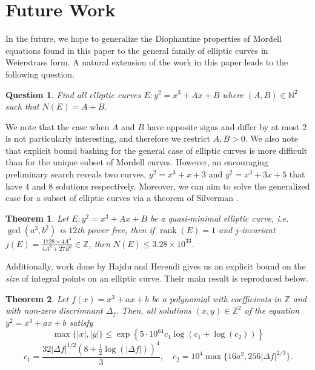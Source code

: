 \documentclass[12pt]{amsart}
\theoremstyle{plain}
\newtheorem{thm}{Theorem}
\newtheorem*{unnumberedqn}{Question}
\theoremstyle{definition}
\theoremstyle{remark}
\numberwithin{equation}{section}
\numberwithin{thm}{section}
\theoremstyle{named}
\theoremstyle{named}
\begin{document}
\section{Future Work}
In the future, we hope to generalize the Diophantine properties of Mordell equations found in this paper to the general family of elliptic curves in Weierstrass form. A natural extension of the work in this paper leads to the following question.
\begin{unnumberedqn}
    Find all elliptic curves $E : y^2 = x^3 + Ax + B$ where $(A,B) \in \mathbb{N}^2$ such that $N(E) = A + B.$
\end{unnumberedqn}
We note that the case when $A$ and $B$ have opposite signs and differ by at most $2$ is not particularly interesting, and therefore we restrict $A, B > 0$. We also note that {explicit} bound bashing for the general case of elliptic curves is more difficult than for the unique subset of Mordell curves. However, an encouraging preliminary search reveals two curves, $y^2 = x^3 + x + 3$ and $y^2 = x^3 + 3x + 5$ that have $4$ and $8$ solutions respectively. Moreover, we can aim to solve the generalized case for a subset of elliptic curves via a theorem of {Silverman} \cite{Silverman+1987+60+100}.
\begin{thm}
Let $E: y^2 = x^3 + Ax + B$ be a quasi-minimal elliptic curve, i.e. $\gcd(a^3, b^2)$ is $12$th power free, then if $\operatorname{rank}(E) = 1$ and $j$-invariant $j(E)=\frac{1728 \times 4A^3}{4A^3 + 27B^2} \in \mathbb{Z}$, then $N(E) \leq 3.28 \times 10^{33}.$ 
\end{thm}
Additionally, work done by {Hajdu and Herendi} \cite{HAJDU1998361} gives us an explicit bound on the \emph{size} of integral points on an elliptic curve. Their main result is reproduced below. 
\begin{thm}
    Let $f(x) = x^3 + ax + b$ be a polynomial with coefficients in $\mathbb{Z}$ and with non-zero discrimnant $\Delta_f.$ Then, all solutions $(x,y) \in \mathbb{Z}^2$ of the equation $y^2 = x^3 + ax + b$ satisfy\[
\max\{|x|, |y|\} \leq \exp\left\{5 \cdot 10^{64} c_1 \log(c_1 + \log(c_2))\right\}
\]
\[
c_1 = \frac{32|\Delta f|^{1/2} \left(8 + \frac{1}{2} \log(|\Delta f|)\right)^4}{3}, \quad c_2 = 10^{4} \max\{16a^2, 256|\Delta f|^{2/3}\}.
\]
\end{thm}
\end{document}
